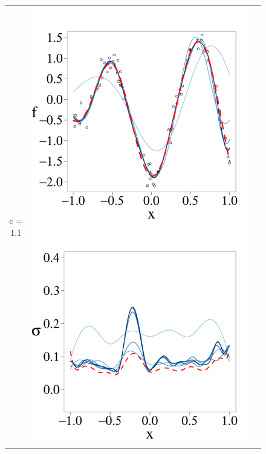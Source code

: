 \documentclass[onecolumn,a4paper,11pt]{article}
\begin{document}
\begin{figure}
\begin{tabular}{ c c c }
\arrayrulecolor{lightgray}\cline{1-2}
c = 1.1 &
\includegraphics[scale=0.215, trim = 0mm 14mm 0mm 14mm, clip]{ch5_fig3_Post_part2.pdf} 
\includegraphics[scale=0.215, trim = 0mm 14mm 0mm 14mm, clip]{ch5_fig3_Sigma_part2.pdf} 

\end{tabular}
\end{figure}
\end{document}
